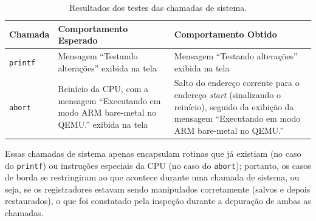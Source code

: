 \begin{table}[htbp]
    \centering
    \small
    \renewcommand{\arraystretch}{1.3}
    \begin{tabular}{@{}p{1.7cm}p{4.6cm}p{4.6cm}@{}}
        \hline
        \textbf{Chamada} & \textbf{Comportamento Esperado} & \textbf{Comportamento Obtido} \\
        \hline
        \texttt{printf} & Mensagem ``Testando alterações'' exibida na tela & Mensagem ``Testando alterações'' exibida na tela \\
        \texttt{abort} & Reinício da CPU, com a mensagem ``Executando em modo ARM bare-metal no QEMU.'' exibida na tela & Salto do endereço corrente para o endereço \textit{start} (sinalizando o reinício), seguido da exibição da mensagem ``Executando em modo ARM bare-metal no QEMU.'' \\
        \hline
    \end{tabular}
    \caption{Resultados dos testes das chamadas de sistema.}
    \label{tab:testes-syscalls}
\end{table}

Essas chamadas de sistema apenas encapsulam rotinas que já existiam (no caso do \texttt{printf}) ou instruções especiais da CPU (no caso do \texttt{abort}); portanto, os casos de borda se restringiram ao que acontece durante uma chamada de sistema, ou seja, se os registradores estavam sendo manipulados corretamente (salvos e depois restaurados), o que foi constatado pela inspeção durante a depuração de ambas as chamadas.